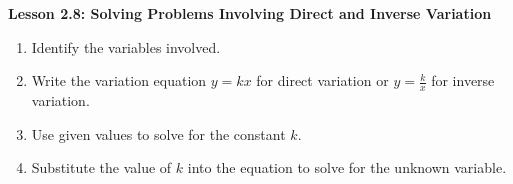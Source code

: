 \begin{center}
\textbf{Lesson 2.8: Solving Problems Involving Direct and Inverse Variation}
\end{center}

\vspace*{-1.5ex}
\begin{enumerate}[noitemsep, label = \color{blue}\arabic*. ]
    \item Identify the variables involved.
    \item Write the variation equation \(y = kx\) for direct variation or \(y = \frac{k}{x}\) for inverse variation.
    \item Use given values to solve for the constant \(k\).
    \item Substitute the value of \(k\) into the equation to solve for the unknown variable.
\end{enumerate}

